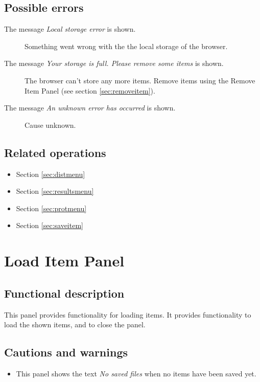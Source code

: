   \subsection*{Possible errors}
  \begin{description}
  \item[The message \emph{Local storage error} is shown.] Something went wrong with the the local storage of the browser.
  \item[The message \emph{Your storage is full. Please remove some items} is shown.] The browser can't store any more items. Remove items using the Remove Item Panel (see section \ref{sec:removeitem}).
  \item[The message \emph{An unknown error has occurred} is shown.] Cause unknown.
  \end{description}

  \subsection*{Related operations}
   \begin{itemize}
   \item Section \ref{sec:distmenu}
   \item Section \ref{sec:resultsmenu}
   \item Section \ref{sec:protmenu}
   \item Section \ref{sec:saveitem}
  \end{itemize}

\section{Load Item Panel}
\label{sec:loaditempanel}
  \subsection*{Functional description}
  This panel provides functionality for loading items. It provides functionality to load the shown items, and to close the panel.

  \subsection*{Cautions and warnings}
  \begin{itemize}
  \item This panel shows the text \emph{No saved files} when no items have been saved yet.
  \end{itemize}

